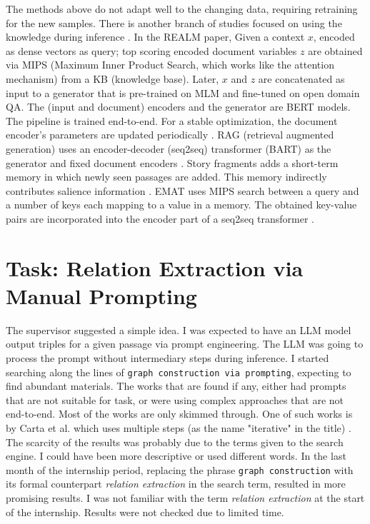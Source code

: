\documentclass{article}
\begin{document}
The methods above do not adapt well to the changing data, requiring retraining for the new samples. There is another branch of studies focused on using the knowledge during inference \cite{pan_unifying_2024}. In the REALM paper, Given a context $x$, encoded as dense vectors as query; top scoring encoded document variables $z$ are obtained via MIPS (Maximum Inner Product Search, which works like the attention mechanism) from a KB (knowledge base). Later, $x$ and $z$ are concatenated as input to a generator that is pre-trained on MLM and fine-tuned on open domain QA. The (input and document) encoders and the generator are BERT models. The pipeline is trained end-to-end. For a stable optimization, the document encoder’s parameters are updated periodically \cite{guu_realm_2020}. RAG (retrieval augmented generation) uses an encoder-decoder (seq2seq) transformer (BART) as the generator and fixed document encoders \cite{lewis_retrieval-augmented_2021}. Story fragments adds a short-term memory in which newly seen passages are added. This memory indirectly contributes salience information \cite{wilmot_memory_2021}. EMAT uses MIPS search between a query and a number of keys each mapping to a value in a memory. The obtained key-value pairs are incorporated into the encoder part of a seq2seq transformer \cite{wu_efficient_2022}. 
\section{Task: Relation Extraction via Manual Prompting}\label{relx_manual_prompt}
The supervisor suggested a simple idea. I was expected to have an LLM model output triples for a given passage via prompt engineering. The LLM was going to process the prompt without intermediary steps during inference. I started searching along the lines of \texttt{graph construction via prompting}, expecting to find abundant materials. The works that are found if any, either had prompts that are not suitable for task, or were using complex approaches that are not end-to-end. Most of the works are only skimmed through. One of such works is by Carta et al. which uses multiple steps (as the name "iterative" in the title) \cite{carta_iterative_2023}. The scarcity of the results was probably due to the terms given to the search engine. I could have been more descriptive or used different words. In the last month of the internship period, replacing the phrase \texttt{graph construction} with its formal counterpart \textit{relation extraction} in the search term, resulted in more promising results. I was not familiar with the term \textit{relation extraction} at the start of the internship. Results were not checked due to limited time. 
\end{document}
